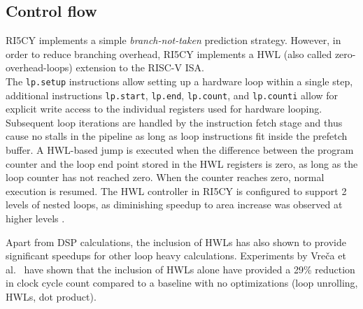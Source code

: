\documentclass[../bachelor_paper.tex]{subfiles}
\begin{document}
\subsection{Control flow}
    \label{sub:plat/ip/ctrl}
RI5CY implements a simple \emph{branch-not-taken} prediction strategy. However, in order to reduce branching overhead, RI5CY implements a \acl{HWL} (also called zero-overhead-loops) extension to the RISC-V \ac{ISA}. \\
The \texttt{lp.setup} instructions allow setting up a hardware loop within a single step, additional instructions \texttt{lp.start}, \texttt{lp.end}, \texttt{lp.count}, and \texttt{lp.counti} allow for explicit write access to the individual registers used for hardware looping. Subsequent loop iterations are handled by the instruction fetch stage and thus cause no stalls in the pipeline as long as loop instructions fit inside the prefetch buffer. A \ac{HWL}-based jump is executed when the difference between the program counter and the loop end point stored in the \ac{HWL} registers is zero, as long as the loop counter has not reached zero. When the counter reaches zero, normal execution is resumed. The \ac{HWL} controller in RI5CY is configured to support 2 levels of nested loops, as diminishing speedup to area increase was observed at higher levels \cite{gautschiNearThresholdRISCVCore2017}.

Apart from \ac{DSP} calculations, the inclusion of \acp{HWL} has also shown to provide significant speedups for other loop heavy calculations. Experiments by Vre\v{c}a et al.\ \cite{vrecaAcceleratingDeepLearning2020} have shown that the inclusion of \acp{HWL} alone have provided a 29\% reduction in clock cycle count compared to a baseline with no optimizations (loop unrolling, \acp{HWL}, dot product).
\end{document}
